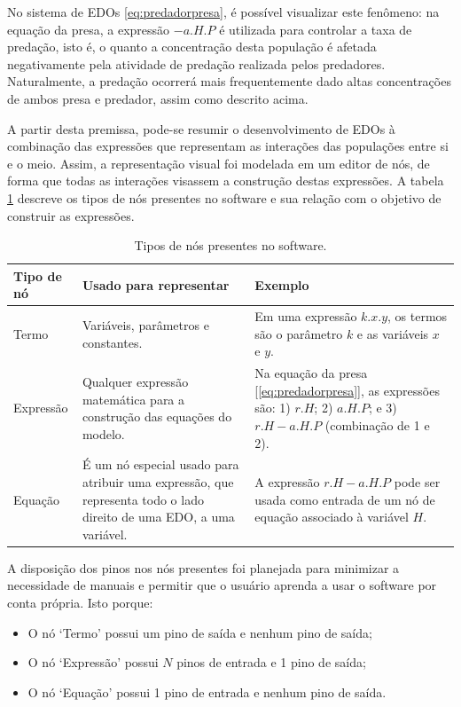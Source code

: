\documentclass[
	12pt,				%
	openright,			%
	oneside,			%
	a4paper,			%
	main=brazil,
	english,			%
	]{ufsj-abntex2}
\begin{document}
No sistema de EDOs \ref{eq:predadorpresa}, é possível visualizar este fenômeno: na equação da presa, a expressão \(-a.H.P\) é utilizada para controlar a taxa de predação, isto é, o quanto a concentração desta população é afetada negativamente pela atividade de predação realizada pelos predadores. Naturalmente, a predação ocorrerá mais frequentemente dado altas concentrações de ambos presa e predador, assim como descrito acima.

A partir desta premissa, pode-se resumir o desenvolvimento de EDOs à combinação das expressões que representam as interações das populações entre si e o meio. Assim, a representação visual foi modelada em um editor de nós, de forma que todas as interações visassem a construção destas expressões. A tabela \ref{tab:tipos-de-nos} descreve os tipos de nós presentes no software e sua relação com o objetivo de construir as expressões.

\begin{table}
\begin{center}
\begin{tabular}{ |m{}|m{}|m{}| }
    \hline
    \rowcolor{lightgray} Tipo de nó & Usado para representar & Exemplo \\
    \hline
    Termo & Variáveis, parâmetros e constantes. & Em uma expressão \(k.x.y\), os termos são o parâmetro $k$ e as variáveis $x$ e $y$. \\
    \hline
    Expressão & Qualquer expressão matemática para a construção das equações do modelo. & Na equação da presa [\ref{eq:predadorpresa}], as expressões são: 1) \(r.H\); 2) \(a.H.P\); e 3) \(r.H - a.H.P\) (combinação de 1 e 2). \\
    \hline
    Equação & É um nó especial usado para atribuir uma expressão, que representa todo o lado direito de uma EDO, a uma variável. & A expressão \(r.H - a.H.P\) pode ser usada como entrada de um nó de equação associado à variável $H$. \\
    \hline 
\end{tabular}
\end{center}
\caption{Tipos de nós presentes no software.}
\label{tab:tipos-de-nos}
\end{table}

A disposição dos pinos nos nós presentes foi planejada para minimizar a necessidade de manuais e permitir que o usuário aprenda a usar o software por conta própria. Isto porque:

\begin{itemize}
    \item O nó `Termo' possui um pino de saída e nenhum pino de saída;
    \item O nó `Expressão' possui $N$ pinos de entrada e 1 pino de saída;
    \item O nó `Equação' possui 1 pino de entrada e nenhum pino de saída.
\end{itemize}
\end{document}

